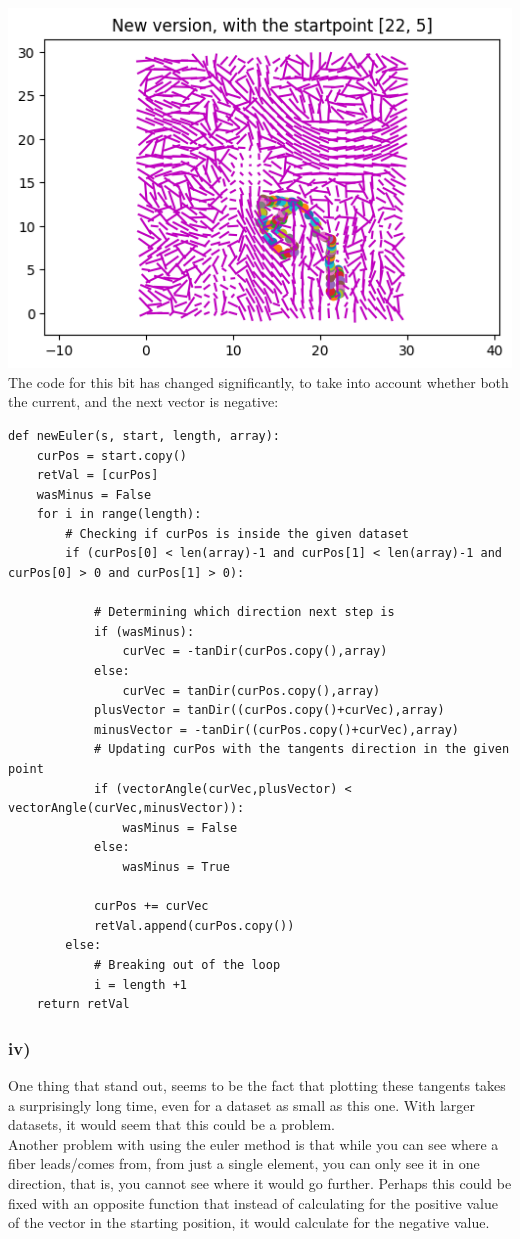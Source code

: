 \includegraphics[width=0.5\linewidth]{new225}
The code for this bit has changed significantly, to take into account whether both the current, and the next vector is negative:
\begin{verbatim}
def newEuler(s, start, length, array):
    curPos = start.copy()
    retVal = [curPos]
    wasMinus = False
    for i in range(length):
        # Checking if curPos is inside the given dataset
        if (curPos[0] < len(array)-1 and curPos[1] < len(array)-1 and curPos[0] > 0 and curPos[1] > 0):
            
            # Determining which direction next step is
            if (wasMinus):
                curVec = -tanDir(curPos.copy(),array)
            else:
                curVec = tanDir(curPos.copy(),array)
            plusVector = tanDir((curPos.copy()+curVec),array)
            minusVector = -tanDir((curPos.copy()+curVec),array)
            # Updating curPos with the tangents direction in the given point
            if (vectorAngle(curVec,plusVector) < vectorAngle(curVec,minusVector)):
                wasMinus = False
            else:
                wasMinus = True
            
            curPos += curVec
            retVal.append(curPos.copy())
        else:
            # Breaking out of the loop
            i = length +1
    return retVal
\end{verbatim}
\subsubsection{iv)}
One thing that stand out, seems to be the fact that plotting these tangents takes a surprisingly long time, even for a dataset as small as this one. With larger datasets, it would seem that this could be a problem.\\
Another problem with using the euler method is that while you can see where a fiber leads/comes from, from just a single element, you can only see it in one  direction, that is, you cannot see where it would go further. Perhaps this could be fixed with an opposite function that instead of calculating for the positive value of the vector in the starting position, it would calculate for the negative value.